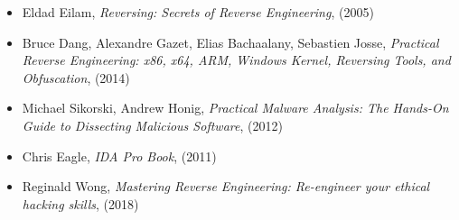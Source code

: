 \begin{itemize}
\item Eldad Eilam, \emph{Reversing: Secrets of Reverse Engineering}, (2005)

\item Bruce Dang, Alexandre Gazet, Elias Bachaalany, Sebastien Josse, \emph{Practical Reverse Engineering: x86, x64, ARM, Windows Kernel, Reversing Tools, and Obfuscation}, (2014)

\item Michael Sikorski, Andrew Honig, \emph{Practical Malware Analysis: The Hands-On Guide to Dissecting Malicious Software}, (2012)

\item Chris Eagle, \emph{IDA Pro Book}, (2011)

\item Reginald Wong, \emph{Mastering Reverse Engineering: Re-engineer your ethical hacking skills}, (2018)

\end{itemize}
